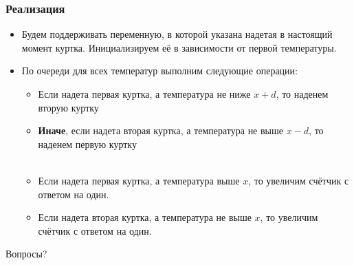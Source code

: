\begin{frame}
    \frametitle{Реализация}

    \begin{itemize}
        \item Будем поддерживать переменную, в которой указана надетая в настоящий момент куртка. Инициализируем её в зависимости от первой температуры.
        \item По очереди для всех температур выполним следующие операции:
        \begin{itemize}
            \item Если надета первая куртка, а температура не ниже $x+d$, то наденем вторую куртку
            \item \textbf{Иначе}, если надета вторая куртка, а температура не  выше $x-d$, то наденем первую куртку\\~\\
            \item Если надета первая куртка, а температура выше $x$, то увеличим счётчик с ответом на один.
            \item Если надета вторая куртка, а температура не выше $x$, то увеличим счётчик с ответом на один.
        \end{itemize}
    \end{itemize}
\end{frame}

\begin{frame}
    \begin{center}
        \Huge Вопросы?
    \end{center}
\end{frame}

